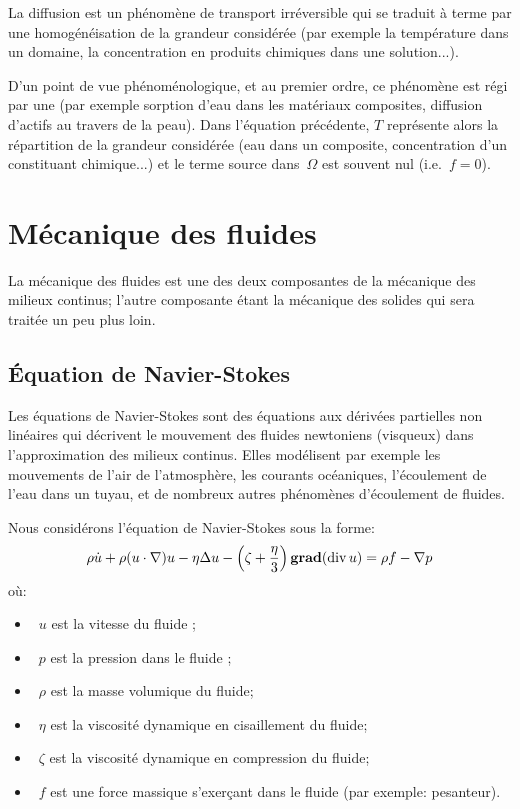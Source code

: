 La diffusion est un phénomène de transport irréversible qui se traduit à terme par une homogénéisation de la grandeur considérée (par exemple la température dans un domaine, la concentration en produits chimiques dans une solution...).

D'un point de vue phénoménologique, et au premier ordre, ce phénomène est régi par une  (par exemple sorption d'eau dans les matériaux composites, diffusion d'actifs au travers de la peau). Dans l'équation précédente, $T$ représente alors la répartition de la grandeur considérée (eau dans un composite, concentration d'un constituant chimique...) et le terme source dans~$\Omega$ est souvent nul (i.e.~$f=0$).





\medskip
\section{Mécanique des fluides}
La mécanique des fluides est une des deux composantes de la mécanique des milieux continus; l'autre composante étant la mécanique des solides qui sera traitée un peu plus loin.





\medskip
\subsection{Équation de Navier-Stokes}\label{Sec-NavierStokes}
Les équations de Navier-Stokes sont des équations aux dérivées partielles non linéaires qui décrivent le mouvement des fluides newtoniens (visqueux) dans l'approximation des milieux continus. Elles modélisent par exemple les mouvements de l'air de l'atmosphère, les courants océaniques, l'écoulement de l'eau dans un tuyau, et de nombreux autres phénomènes d'écoulement de fluides.

\medskip
Nous considérons l'équation de Navier-Stokes sous la forme:
\begin{equation}
\rho \dot{u} + \rho (u\cdot\nabla)u - \eta \Delta u
- \left( \zeta + \frac{\eta}{3} \right) \operatorname{\mathbf{grad}} (\operatorname{div} u)
= \rho f - \nabla p
\end{equation}
où:
\begin{itemize}
  \item~$u$ est la vitesse du fluide ;
  \item~$p$ est la pression dans le fluide ;
  \item~$\rho$ est la masse volumique du fluide;
  \item~$\eta$ est la viscosité dynamique en cisaillement du fluide;
  \item~$\zeta$ est la viscosité dynamique en compression du fluide;
  \item~$f$ est une force massique s'exerçant dans le fluide (par exemple: pesanteur).
\end{itemize}


